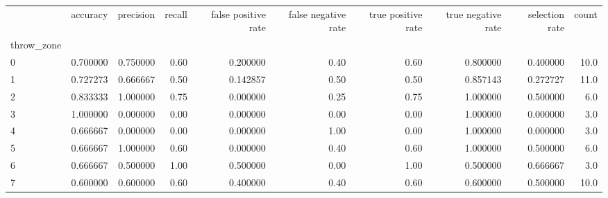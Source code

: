 \begin{tabular}{lrrrrrrrrr}
\toprule
{} &  accuracy &  precision &  recall &  false positive rate &  false negative rate &  true positive rate &  true negative rate &  selection rate &  count \\
throw\_zone &           &            &         &                      &                      &                     &                     &                 &        \\
\midrule
0          &  0.700000 &   0.750000 &    0.60 &             0.200000 &                 0.40 &                0.60 &            0.800000 &        0.400000 &   10.0 \\
1          &  0.727273 &   0.666667 &    0.50 &             0.142857 &                 0.50 &                0.50 &            0.857143 &        0.272727 &   11.0 \\
2          &  0.833333 &   1.000000 &    0.75 &             0.000000 &                 0.25 &                0.75 &            1.000000 &        0.500000 &    6.0 \\
3          &  1.000000 &   0.000000 &    0.00 &             0.000000 &                 0.00 &                0.00 &            1.000000 &        0.000000 &    3.0 \\
4          &  0.666667 &   0.000000 &    0.00 &             0.000000 &                 1.00 &                0.00 &            1.000000 &        0.000000 &    3.0 \\
5          &  0.666667 &   1.000000 &    0.60 &             0.000000 &                 0.40 &                0.60 &            1.000000 &        0.500000 &    6.0 \\
6          &  0.666667 &   0.500000 &    1.00 &             0.500000 &                 0.00 &                1.00 &            0.500000 &        0.666667 &    3.0 \\
7          &  0.600000 &   0.600000 &    0.60 &             0.400000 &                 0.40 &                0.60 &            0.600000 &        0.500000 &   10.0 \\
\bottomrule
\end{tabular}
